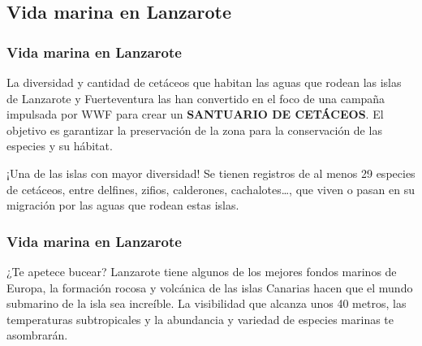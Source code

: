\documentclass{beamer}
\begin{document}
	\begin{frame}
		\section{Vida marina en Lanzarote}
		\frametitle{Vida marina en Lanzarote}
		
		La diversidad y cantidad de cetáceos que habitan las aguas que rodean las islas de Lanzarote y Fuerteventura las han convertido en el foco de una campaña impulsada por WWF para crear un \textbf{SANTUARIO DE CETÁCEOS}. El objetivo es garantizar la preservación de la zona para la conservación de las especies y su hábitat.

		\pause
		
		\begin{block}{¡Una de las islas con mayor diversidad!}
			Se tienen registros de al menos 29 especies de cetáceos, entre delfines, zifios, calderones, cachalotes…, que viven o pasan en su migración por las aguas que rodean estas islas.
		\end{block}
		
	\end{frame}
	
	\begin{frame}
		\frametitle{Vida marina en Lanzarote}
		
		\begin{alertblock}{¿Te apetece bucear?}
			Lanzarote tiene algunos de los mejores fondos marinos de Europa, la formación rocosa y volcánica de las islas Canarias hacen que el mundo submarino de la isla sea increíble. La visibilidad que alcanza unos 40 metros, las temperaturas subtropicales y la abundancia y variedad de especies marinas te asombrarán.
		\end{alertblock}
		
	\end{frame}
\end{document}
